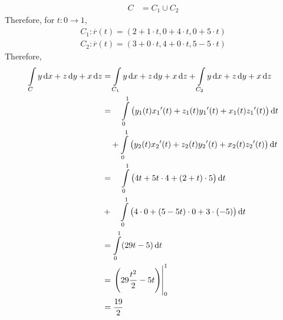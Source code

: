 \documentclass[fleqn, a4paper, 12pt, twoside]{article}
\theoremstyle{definition}
\theoremstyle{theorem}
\begin{document}
{\begin{question}
\begin{figure}[H]
	\end{figure}
\end{question}

\begin{solution}
	\begin{align*}
		C &= C_1 \cup C_2
	\end{align*}
	Therefore, for $t : 0 \to 1$,
	\begin{gather*}
		C_1 : \overline{r}(t) = (2 + 1 \cdot t , 0 + 4 \cdot t , 0 + 5 \cdot t) \\
		C_2 : \overline{r}(t) = (3 + 0 \cdot t , 4 + 0 \cdot t , 5 - 5 \cdot t)
	\end{gather*}
	Therefore,
	\begin{align*}
		\int\limits_{C} y \dif x + z \dif y + x \dif z & = \int\limits_{C_1} y \dif x + z \dif y + x \dif z + \int\limits_{C_2} y \dif x + z \dif y + x \dif z    \\
                                                               & = \quad \int\limits_{0}^{1} \left( y_1(t) {x_1}'(t) + z_1(t) {y_1}'(t) + x_1(t) {z_1}'(t) \right) \dif t \\
                                                               & \quad + \int\limits_{0}^{1} \left( y_2(t) {x_2}'(t) + z_2(t) {y_2}'(t) + x_2(t) {z_2}'(t) \right) \dif t \\
                                                               & = \quad \int\limits_{0}^{1} \left( 4 t + 5 t \cdot 4 + (2 + t) \cdot 5 \right) \dif t                    \\
                                                               & + \quad \int\limits_{0}^{1} \left( 4 \cdot 0 + (5 - 5 t) \cdot 0 + 3 \cdot (-5) \right) \dif t           \\
                                                               & = \int\limits_{0}^{1} (29 t - 5) \dif t                                                                  \\
                                                               & = \left. \left( 29 \frac{t^2}{2} - 5 t \right) \right|_{0}^{1}                                           \\
                                                               & = \frac{19}{2}
	\end{align*}
\end{solution}

}
\end{document}
